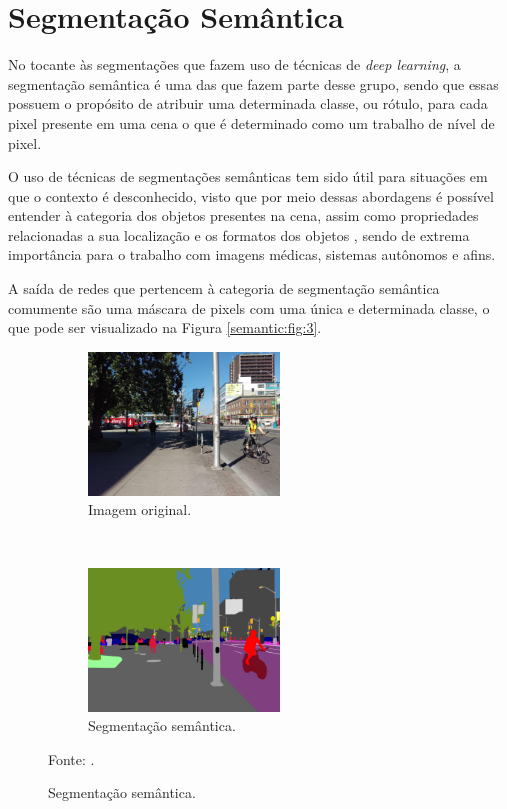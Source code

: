 \clearpage
\newpage
\section{Segmentação Semântica}
\label{semantic:semantic}
No tocante às segmentações que fazem uso de técnicas de \textit{deep learning}, a segmentação semântica é uma das que fazem parte desse grupo, sendo que essas possuem o propósito de atribuir uma determinada classe, ou rótulo, para cada pixel presente em uma cena \citep{Wang2017, Ghosh2019, Shelhamer2016, Arbelaez2012,Zhang2018} o que é determinado como um trabalho de nível de pixel.

O uso de técnicas de segmentações semânticas tem sido útil para situações em que o contexto é desconhecido, visto que por meio dessas abordagens é possível entender à categoria dos objetos presentes na cena, assim como propriedades relacionadas a sua localização e os formatos dos objetos \citep{Zhang2018}, sendo de extrema importância para o trabalho com imagens médicas, sistemas autônomos e afins.

A saída de redes que pertencem à categoria de segmentação semântica comumente são uma máscara de 
pixels com uma única e determinada classe, o que pode ser visualizado na Figura \ref{semantic:fig:3}.

\begin{figure}[H]
   \caption{Segmentação semântica.}
   \centering
   \label{semantic:fig:3}
    \begin{subfigure}[t]{0.45\textwidth}
        \centering
        \includegraphics[height=1.5in]{recursos/imagens/semantic/t1.jpg}
        \caption{Imagem original.}
        \label{semantic:fig:3.1}
    \end{subfigure}%
    ~ 
    \begin{subfigure}[t]{0.45\textwidth}
        \centering
        \includegraphics[height=1.5in]{recursos/imagens/semantic/s1.png}
        \caption{Segmentação semântica.}
        \label{semantic:fig:3.2}
    \end{subfigure}%

    Fonte: \cite{Neuhold2017_ICCV}.
\end{figure}

